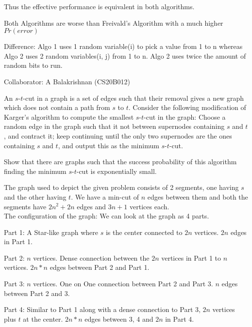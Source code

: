 \documentclass[addpoints,12pt]{exam}
\begin{document}
\begin{questions}
\begin{solution}
            Thus the effective performance is equivalent in both algorithms.

            Both Algorithms are worse than Freivald's Algorithm with a much higher $Pr(error)$

            Difference: Algo 1 uses 1 random variable(i) to pick a value from 1 to n whereas Algo 2 uses 2 random variables(i, j) from 1 to n. Algo 2 uses twice the amount of random bits to run.

            Collaborator: A Balakrishnan (CS20B012)


          \end{solution}
		
          \question[5]  An $s$-$t$-cut in a graph is a set of edges such that
          their removal gives a new graph which does not contain a path from $s$
          to $t$. Consider the following modification of Karger's algorithm to
          compute the smallest $s$-$t$-cut in the graph: Choose a random edge in
          the graph such that it not between supernodes containing $s$ and $t$,
          and contract it; keep continuing until the only two supernodes are the
          ones containing $s$ and $t$, and output this as the minimum
          $s$-$t$-cut.

          Show that there are graphs such that the success probability of this
          algorithm finding the minimum $s$-$t$-cut is exponentially small.
          \begin{solution}
          
            The graph used to depict the given problem consists of 2 segments, one having $s$ and the other having $t$. We have a min-cut of $n$ edges between them and both the segments have $2n^2 + 2n$ edges and $3n+1$ vertices each. \\
            
            The configuration of the graph: We can look at the graph as 4 parts.

            Part 1: A Star-like graph where $s$ is the center connected to $2n$ vertices. $2n$ edges in Part 1.
            
            Part 2: $n$ vertices. Dense connection between the $2n$ vertices in Part 1 to $n$ vertices. $2n*n$ edges between Part 2 and Part 1.

            Part 3: $n$ vertices. One on One connection between Part 2 and Part 3. $n$ edges between Part 2 and 3.

            Part 4: Similar to Part 1 along with a dense connection to Part 3, $2n$ vertices plus $t$ at the center. $2n*n$ edges between 3, 4 and $2n$ in Part 4.
            \\


\end{solution}
\end{questions}
\end{document}
